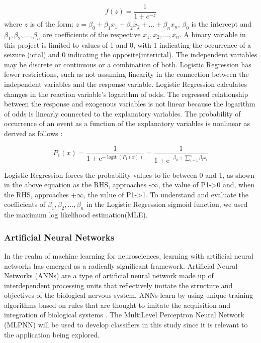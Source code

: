 \documentclass[10pt,twocolumn,letterpaper]{article}
\begin{document}
$$
f(z)=\frac{1}{1+e^{-z}}
$$
where $z$ is of the form: $z=\beta_{0}+\beta_{1} x_{1}+\beta_{2} x_{2}+\ldots+\beta_{n} x_{n}$, $\beta_{0}$ is the intercept and $\beta_{1} , \beta_{2} , ... , \beta_{n}$ are coefficients of the respective $x_{1}, x_{2},..., x_{n}$. A binary variable in this project is limited to values of 1 and 0, with 1 indicating the occurrence of a seizure (ictal) and 0 indicating the opposite(interictal). The independent variables may be discrete or continuous or a combination of both. Logistic Regression has fewer restrictions, such as not assuming linearity in the connection between the independent variables and the response variable. Logistic Regression calculates changes in the reaction variable's logarithm of odds. The regressed relationship between the response and exogenous variables is not linear because the logarithm of odds is linearly connected to the explanatory variables. The probability of occurrence of an event as a function of the explanatory variables is nonlinear as derived as follows\cite{Logisticr} : 

\begin{equation}
P_{1}(x)=\frac{1}{1+\mathrm{e}^{-\operatorname{logit}\left(P_{1}(x)\right)}}=\frac{1}{1+\mathrm{e}^{-\beta_{0}+\sum_{i=1}^{n} \beta_{i} x_{i}}}
\end{equation}

Logistic Regression forces the probability values to lie between 0 and 1, as shown in the above equation as the RHS, approaches -$\infty$, the value of P1->0 and, when the RHS, approaches +$\infty$, the value of P1->1. To understand and evaluate the coefficients of $\beta_{1} , \beta_{2} , ... , \beta_{n}$ in the Logistic Regression sigmoid function, we used the maximum log likelihood estimation(MLE). 

\subsubsection{Artificial Neural Networks}
In the realm of machine learning for neurosciences, learning with artificial neural networks has emerged as a radically significant framework. Artificial Neural Networks (ANNs) are a type of artificial neural network made up of interdependent processing units that reflectively imitate the structure and objectives of the biological nervous system. ANNs learn by using unique training algorithms based on rules that are thought to imitate the acquisition and integration of biological systems \cite{Logisticr}. The MultiLevel Perceptron Neural Network (MLPNN) will be used to develop classifiers in this study since it is relevant to the application being explored. 
\end{document}
